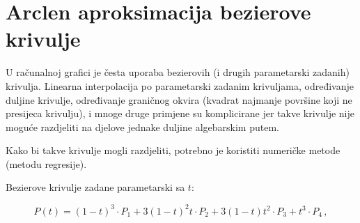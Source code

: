 \section{Arclen aproksimacija bezierove krivulje}

U računalnoj grafici je česta uporaba bezierovih (i drugih parametarski zadanih)
krivulja. Linearna interpolacija po parametarski zadanim krivuljama, određivanje
duljine krivulje, određivanje graničnog okvira (kvadrat najmanje površine koji
ne presijeca krivulju), i mnoge druge primjene su komplicirane jer takve
krivulje nije moguće razdjeliti na djelove jednake duljine algebarskim putem.

Kako bi takve krivulje mogli razdjeliti, potrebno je koristiti numeričke metode
(metodu regresije).

\bigskip
Bezierove krivulje zadane parametarski sa $t$:

\begin{equation*}
    P(t) = (1-t)^3\cdot P_1 + 3 (1-t)^2 t\cdot P_2 +3(1-t) t^2 \cdot P_3 + t^3 \cdot P_4\,,
\end{equation*}
